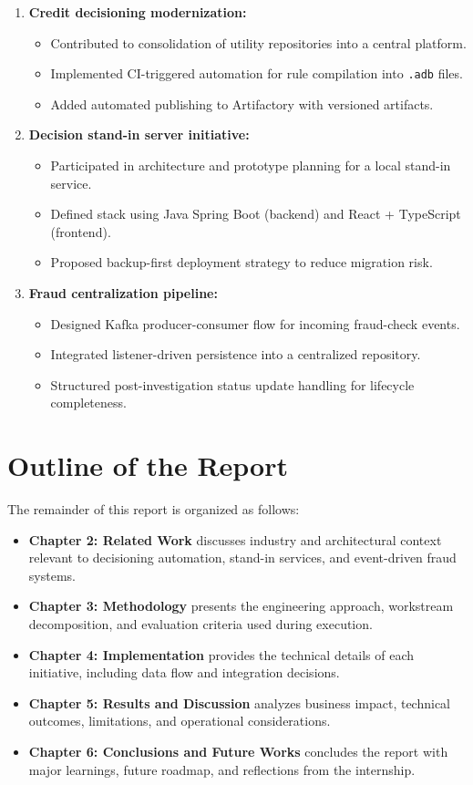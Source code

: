 \begin{enumerate}
	\item \textbf{Credit decisioning modernization:}
	\begin{itemize}
		\item Contributed to consolidation of utility repositories into a central platform.
		\item Implemented CI-triggered automation for rule compilation into \texttt{.adb} files.
		\item Added automated publishing to Artifactory with versioned artifacts.
	\end{itemize}

	\item \textbf{Decision stand-in server initiative:}
	\begin{itemize}
		\item Participated in architecture and prototype planning for a local stand-in service.
		\item Defined stack using Java Spring Boot (backend) and React + TypeScript (frontend).
		\item Proposed backup-first deployment strategy to reduce migration risk.
	\end{itemize}

	\item \textbf{Fraud centralization pipeline:}
	\begin{itemize}
		\item Designed Kafka producer-consumer flow for incoming fraud-check events.
		\item Integrated listener-driven persistence into a centralized repository.
		\item Structured post-investigation status update handling for lifecycle completeness.
	\end{itemize}
\end{enumerate}

\section{Outline of the Report}

The remainder of this report is organized as follows:

\begin{itemize}
	\item \textbf{Chapter 2: Related Work} discusses industry and architectural context relevant to decisioning automation, stand-in services, and event-driven fraud systems.
	\item \textbf{Chapter 3: Methodology} presents the engineering approach, workstream decomposition, and evaluation criteria used during execution.
	\item \textbf{Chapter 4: Implementation} provides the technical details of each initiative, including data flow and integration decisions.
	\item \textbf{Chapter 5: Results and Discussion} analyzes business impact, technical outcomes, limitations, and operational considerations.
	\item \textbf{Chapter 6: Conclusions and Future Works} concludes the report with major learnings, future roadmap, and reflections from the internship.
\end{itemize}
